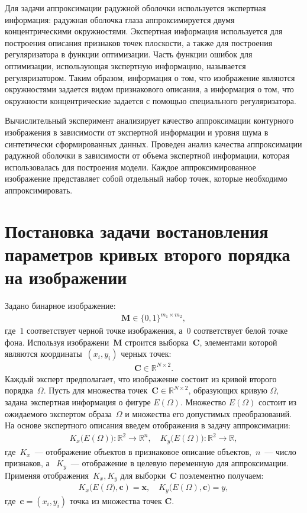 \documentclass[12pt]{a&t}
\begin{document}
Для задачи аппроксимации радужной оболочки используется экспертная информация: радужная оболочка глаза аппроксимируется двумя концентрическими окружностями.
Экспертная информация используется для построения описания признаков точек плоскости, а также для построения регуляризатора в функции оптимизации.
Часть функции ошибок для оптимизации, использующая экспертную информацию, называется регуляризатором.
Таким образом, информация о том, что изображение являются окружностями задается видом признакового описания, а информация о том, что окружности концентрические задается с помощью специального регуляризатора.

Вычислительный эксперимент анализирует качество аппроксимации контурного изображения в зависимости от экспертной информации и уровня шума в синтетически сформированных данных. Проведен анализ качества аппроксимации радужной оболочки в зависимости от объема экспертной информации, которая использовалась для построения модели.
Каждое аппроксимированное изображение представляет собой отдельный набор точек, которые необходимо аппроксимировать.

\section{Постановка задачи востановления параметров кривых второго порядка на изображении}
Задано бинарное изображение:
\begin{gather}
\mathbf{M} \in \{0, 1 \}^{m_1\times m_2},
\end{gather}
где~$1$ соответствует черной точке изображения, а~$0$ соответствует белой точке фона.
Используя изображени~$\mathbf{M}$ строится выборка~$\mathbf{C}$, элементами которой являются координаты~$(x_i, y_i)$ черных точек:
\begin{gather}
\mathbf{C} \in \mathbb{R}^{N \times 2}.
\end{gather}
Каждый эксперт предполагает, что изображение состоит из кривой второго порядка~$\Omega$.
Пусть для множества точек~$\mathbf {C} \in \mathbb{R}^{N \times 2} $, образующих кривую $\Omega,$ задана экспертная информация о фигуре $E(\Omega)$.
Множество $E(\Omega)$ состоит из ожидаемого экспертом образа~$\Omega$ и множества его допустимых преобразований. На основе экспертного описания введем отображения в задачу аппроксимации:
\begin{gather}
\label{eq1}
	K_{x}\bigl(E(\Omega)\bigr): \mathbb{R}^{2} \rightarrow \mathbb{R}^{n}, \quad K_{y}\bigl(E(\Omega)\bigr): \mathbb{R}^{2} \rightarrow \mathbb{R},
\end{gather} 
где~$K_{x}$~--- отображение объектов в признаковое описание объектов,~$n$~--- число признаков, а ~$K_{y}$~---  отображение в целевую переменную для аппроксимации. Применяя отображения~$K_{x}, K_{y}$ для выборки~$\mathbf{C}$ поэлементно получаем:
\begin{gather}
\label{eq2}
	K_{x}\bigl(E(\Omega\bigr), \mathbf{c}) = \mathbf{x}, \quad  K_{y}\bigl(E(\Omega), \mathbf{c}\bigr) = y,
\end{gather}
где~$\mathbf{c} = (x_i, y_i)$ точка из множества точек $\mathbf{C}$.
\end{document}
